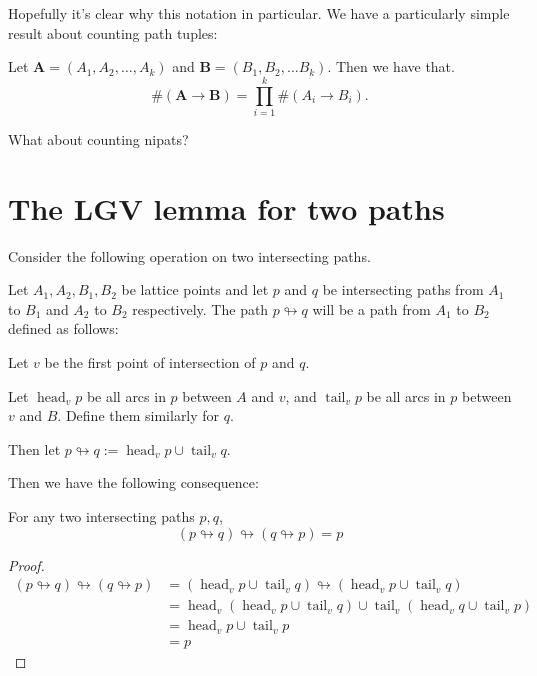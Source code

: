 \documentclass{article}
\DeclareMathOperator{\head}{head}
\DeclareMathOperator{\tail}{tail}
\begin{document}
Hopefully it's clear why this notation in particular. We have a particularly simple result about counting path tuples:

\begin{remark}
    Let $\mathbf{A} = (A_1, A_2, \ldots, A_k)$ and $\mathbf{B} = (B_1, B_2, \ldots B_k)$. Then we have that.
    \[
        \#(\mathbf{A}{\rightarrow}\mathbf{B}) = \prod_{i=1}^k \#(A_i{\to}B_i).
    \]
\end{remark}

What about counting nipats?

\section{The LGV lemma for two paths}

Consider the following operation on two intersecting paths.

\begin{definition}
    Let $A_1, A_2, B_1, B_2$ be lattice points and let $p$ and $q$ be intersecting paths from $A_1$ to $B_1$ and $A_2$ to $B_2$ respectively. The path $p\looparrowright q$ will be a path from $A_1$ to $B_2$ defined as follows:

    Let $v$ be the first point of intersection of $p$ and $q$.

    Let $\head_v p$ be all arcs in $p$ between $A$ and $v$, and $\tail_v p$ be all arcs in $p$ between $v$ and $B$. Define them similarly for $q$.

    Then let $p\looparrowright q := \head_v p \cup \tail_v q$. 
\end{definition}

Then we have the following consequence:

\begin{remark}
    For any two intersecting paths $p, q$, 
    \[
        (p\looparrowright q)\looparrowright(q\looparrowright p) = p 
    \]
\end{remark}
\begin{proof}
    \begin{align*}
        (p\looparrowright q)\looparrowright(q\looparrowright p) &= (\head_v p \cup \tail_v q) \looparrowright (\head_v p \cup \tail_v q) \\
                                                                &= \head_v (\head_v p \cup \tail_v q) \cup \tail_v (\head_v q \cup \tail_v p) \\
                                                                &= \head_v p \cup \tail_v p \\
                                                                &= p
    \end{align*}
\end{proof}
\end{document}
